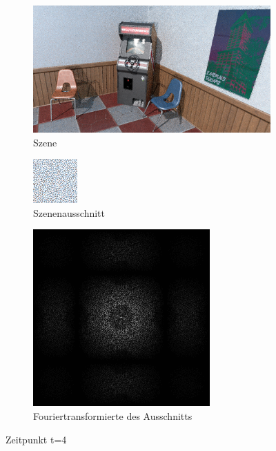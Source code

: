 \begin{figure}[H]
    \begin{subfigure}{\textwidth}  
        \centering \includegraphics[scale=.25]{content/TemporalerAlg/Bilder/Retargeting/Screenshots/seed_debug_6.0_selection.png}
        \caption{Szene}
        \label{fig:Retargeting_And_Sorting_Szene_t4}
    \end{subfigure}
    \begin{subfigure}{0.5\textwidth}
        \centering\includegraphics[width=0.4\linewidth]{content/TemporalerAlg/Bilder/Retargeting/Screenshots/seed_debug_6.0_ausschnitt.png} 
        \caption{Szenenausschnitt}
        \label{fig:Retargeting_And_Sorting_ausschnitt_t4}
    \end{subfigure}
    \begin{subfigure}{0.5\textwidth}
        \centering\includegraphics[width=0.4\linewidth]{content/TemporalerAlg/Bilder/Retargeting/Screenshots/Spektren/seed_debug_6.0_ausschnitt.png}
        \caption{Fouriertransformierte des Ausschnitts}
        \label{fig:Retargeting_And_Sorting_Fouriertransformierte_t4}
    \end{subfigure}
        \caption{Zeitpunkt t=4}
        \label{fig:Retargeting_And_Sorting_Verlauf_t4}
\end{figure}

